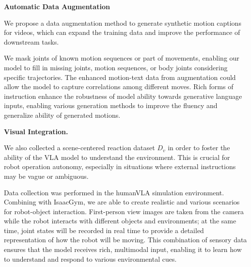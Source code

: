 \textbf{Automatic Data Augmentation}

We propose a data augmentation method to generate synthetic motion captions for videos, which can expand the training data and improve the performance of downstream tasks.

We mask joints of known motion sequences or part of movements, enabling our model to fill in missing joints, motion sequences, or body joints considering specific trajectories. The enhanced motion-text data from augmentation could allow the model to capture correlations among different moves. Rich forms of instruction enhance the robustness of model ability towards generative language inputs, enabling various generation methods to improve the fluency and generalize ability of generated motions.





\textbf{Visual Integration. }

We also collected a scene-centered reaction dataset $D_v$ in order to foster the ability of the VLA model to understand the environment. This is crucial for robot operation autonomy, especially in situations where external instructions may be vague or ambiguous.

Data collection was performed in the humanVLA simulation environment. Combining with IsaacGym, we are able to create realistic and various scenarios for robot-object interaction. First-person view images are taken from the camera while the robot interacts with different objects and environments; at the same time, joint states will be recorded in real time to provide a detailed representation of how the robot will be moving. This combination of sensory data ensures that the model receives rich, multimodal input, enabling it to learn how to understand and respond to various environmental cues.












